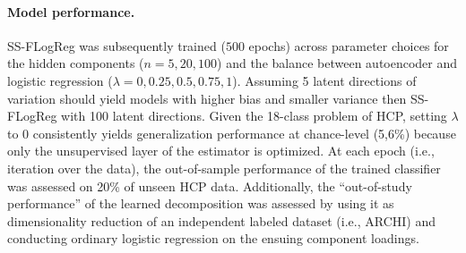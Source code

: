 \documentclass{article} %
\begin{document}
\begin{table}[h]
 \centering
 \vspace{-0.2cm}
 \caption{\textbf{Serial versus parallel dimensionality reduction and classification.}
 Chance is at 5,6\%.
 }
 \label{table_one}
 \end{table}
\paragraph{Model performance.}
SS-FLogReg was subsequently trained ($500$ epochs) across parameter choices
for the hidden components ($n=5, 20, 100$) and
the balance between autoencoder and logistic regression
($\lambda=0, 0.25, 0.5, 0.75, 1$).
Assuming 5 latent directions of variation should yield models with
higher bias and smaller variance then SS-FLogReg with 100 latent directions.
%
Given the 18-class problem of HCP, setting $\lambda$ to $0$
consistently yields generalization performance
at chance-level (5,6\%) because
only the unsupervised layer of the estimator is optimized.
%
At each epoch (i.e., iteration over the data),
the out-of-sample performance of the trained classifier
was assessed on 20\% of unseen HCP data.
Additionally, the ``out-of-study performance'' of the learned decomposition
was assessed by using it as dimensionality reduction of an
independent labeled dataset (i.e., ARCHI) and conducting ordinary
logistic regression on the ensuing component loadings.
\end{document}

